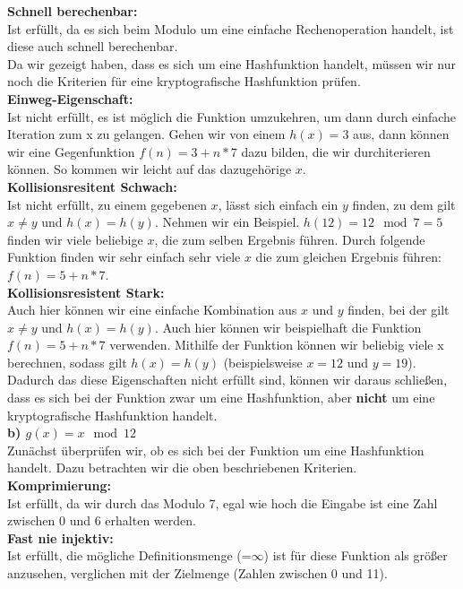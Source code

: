 \documentclass[german]{../uebung}
\begin{document}
\begin{exercise}{1}
    \textbf{Schnell berechenbar:}\\
    Ist erfüllt, da es sich beim Modulo um eine einfache Rechenoperation handelt, ist diese auch schnell berechenbar.\\
    Da wir gezeigt haben, dass es sich um eine Hashfunktion handelt, müssen wir nur noch die Kriterien für eine kryptografische Hashfunktion prüfen.\\
    \textbf{Einweg-Eigenschaft:}\\
    Ist nicht erfüllt, es ist möglich die Funktion umzukehren, um dann durch einfache Iteration zum x zu gelangen. Gehen wir von einem \(h(x)=3\) aus, dann können wir eine Gegenfunktion \(f(n)=3+n*7\) dazu bilden, die wir durchiterieren können. So kommen wir leicht auf das dazugehörige \(x\).\\
    \textbf{Kollisionsresitent Schwach:}\\
    Ist nicht erfüllt, zu einem gegebenen \(x\), lässt sich einfach ein \(y\) finden, zu dem gilt \(x \neq y\) und \(h(x)=h(y)\). Nehmen wir ein Beispiel. \(h(12)=12 \mod 7= 5\) finden wir viele beliebige \(x\), die zum selben Ergebnis führen. Durch folgende Funktion finden wir sehr einfach sehr viele \(x\) die zum gleichen Ergebnis führen: \(f(n)=5+n*7\).\\
    \textbf{Kollisionsresistent Stark:}\\
    Auch hier können wir eine einfache Kombination aus \(x\) und \(y\) finden, bei der gilt \(x \neq y\) und \(h(x)=h(y)\). Auch hier können wir beispielhaft die Funktion \(f(n)=5+n*7\) verwenden. Mithilfe der Funktion können wir beliebig viele x berechnen, sodass gilt \(h(x)=h(y)\) (beispielsweise \(x=12\) und \(y=19\)).\\
    Dadurch das diese Eigenschaften nicht erfüllt sind, können wir daraus schließen, dass es sich bei der Funktion zwar um eine Hashfunktion, aber \textbf{nicht} um eine kryptografische Hashfunktion handelt.\\
    \textbf{b) \(g(x) = x \mod 12\)}\\
    Zunächst überprüfen wir, ob es sich bei der Funktion um eine Hashfunktion handelt. Dazu betrachten wir die oben beschriebenen Kriterien.\\
    \textbf{Komprimierung:}\\
    Ist erfüllt, da wir durch das Modulo 7, egal wie hoch die Eingabe ist eine Zahl zwischen 0 und 6 erhalten werden.\\
    \textbf{Fast nie injektiv:}\\
    Ist erfüllt, die mögliche Definitionsmenge (=\(\infty\)) ist für diese Funktion als größer anzusehen, verglichen mit der Zielmenge (Zahlen zwischen 0 und 11).\\

\end{exercise}
\end{document}
